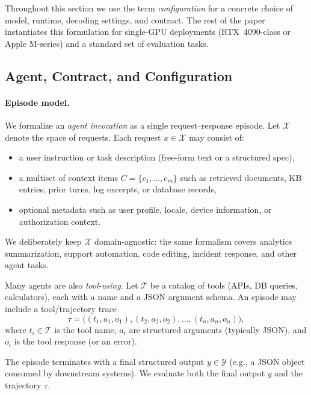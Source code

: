 Throughout this section we use the term \emph{configuration} for a concrete choice of model, runtime, decoding settings, and contract.
The rest of the paper instantiates this formulation for single-GPU deployments (RTX~4090-class or Apple M-series) and a standard set of evaluation tasks.

\subsection{Agent, Contract, and Configuration}
\label{sec:problem-agent}

\paragraph{Episode model.}
We formalize an \emph{agent invocation} as a single request--response episode.
Let $\mathcal{X}$ denote the space of requests.
Each request $x \in \mathcal{X}$ may consist of:
\begin{itemize}[leftmargin=12pt]
    \item a user instruction or task description (free-form text or a structured spec),
    \item a multiset of context items $C=\{c_1,\dots,c_m\}$ such as retrieved documents, KB entries, prior turns, log excerpts, or database records,
    \item optional metadata such as user profile, locale, device information, or authorization context.
\end{itemize}
We deliberately keep $\mathcal{X}$ domain-agnostic: the same formalism covers analytics summarization, support automation, code editing, incident response, and other agent tasks.

Many agents are also \emph{tool-using}.
Let $\mathcal{T}$ be a catalog of tools (APIs, DB queries, calculators), each with a name and a JSON argument schema.
An episode may include a tool/trajectory trace
\[
\tau = \bigl((t_1,a_1,o_1), (t_2,a_2,o_2), \dots, (t_n,a_n,o_n)\bigr),
\]
where $t_i \in \mathcal{T}$ is the tool name, $a_i$ are structured arguments (typically JSON), and $o_i$ is the tool response (or an error).

The episode terminates with a final structured output $y \in \mathcal{Y}$ (e.g., a JSON object consumed by downstream systems).
We evaluate both the final output $y$ and the trajectory $\tau$.

